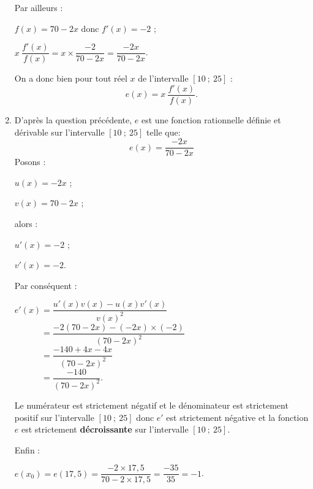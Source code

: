 \begin{corrige}
\begin{enumerate}
          Par ailleurs :
          \par
          $f(x)=70-2x$ donc $f'(x)=-2$ ;
          \par
          $x\ \dfrac{f'(x)}{f(x)} = x \times \dfrac{-2}{70-2x}=\dfrac{-2x}{70-2x}$.
          \par
          On a donc bien pour tout réel $x$ de l'intervalle $[10~;~25]$ :
          \[ e(x)=x\ \dfrac{f'(x)}{f(x)}. \]
          \item
          D'après la question précédente, $e$ est une fonction rationnelle définie et dérivable sur l'intervalle $[10~;~25]$ telle que:
          \[ e(x)=\dfrac{-2x}{70-2x} \]
          Posons :
          \par
          $u(x)=-2x$ ;
          \par
          $v(x)=70-2x$ ;
          \par
          alors :
          \par
          $u'(x)=-2$ ;
          \par
          $v'(x)=-2$.
          \par
          Par conséquent :
          \par
          $e'(x)= \dfrac{u'(x)v(x)-u(x)v'(x)}{v(x)^2}$\\
          $\phantom{e'(x)}=\dfrac{-2(70-2x)-(-2x) \times (-2)}{(70-2x)^2}$\\
          $\phantom{e'(x)}= \dfrac{-140+4x-4x}{(70-2x)^2}$\\
          $\phantom{e'(x)}= \dfrac{-140}{(70-2x)^2}.$
          \par
          Le numérateur est strictement négatif et le dénominateur est strictement positif sur l'intervalle $[10~;~25]$ donc $e'$ est strictement négative et la fonction $e$ est strictement \textbf{décroissante} sur l'intervalle $[10~;~25]$.
          \par
          Enfin :
          \par
          $e(x_0)=e(17,5)=\dfrac{-2 \times 17,5}{70-2 \times 17,5}$\nosp$=\dfrac{-35}{35}=-1$.
          \par
     \end{enumerate}
\end{corrige}
